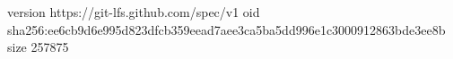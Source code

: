 version https://git-lfs.github.com/spec/v1
oid sha256:ee6cb9d6e995d823dfcb359eead7aee3ca5ba5dd996e1c3000912863bde3ee8b
size 257875
